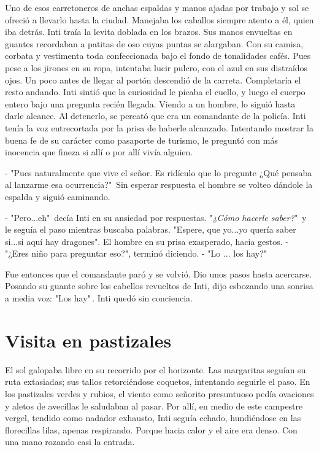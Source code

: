 Uno de esos carretoneros de anchas espaldas y manos ajadas por trabajo y sol se ofreció a llevarlo hasta la ciudad.  Manejaba los caballos siempre atento a él, quien iba detrás. Inti traía la levita doblada en los brazos. Sus manos envueltas en guantes recordaban a patitas de oso cuyas puntas se alargaban. Con su camisa, corbata y vestimenta toda confeccionada bajo el fondo de tonalidades cafés. Pues pese a los jirones en su ropa, intentaba lucir pulcro, con el azul en sus distraídos ojos. Un poco antes de llegar al portón descendió de la carreta. Completaría el resto andando. Inti sintió que la curiosidad le picaba el cuello, y luego el cuerpo entero bajo una pregunta recién llegada. Viendo a un hombre, lo siguió hasta darle alcance. Al detenerlo, se percató que era un comandante de la policía. Inti tenía la voz entrecortada por la prisa de haberle alcanzado. Intentando mostrar la buena fe de su carácter como pasaporte de turismo, le preguntó con más inocencia que fineza si allí o por allí vivía alguien.

- "Pues naturalmente que vive el señor. Es ridículo que lo pregunte ¿Qué pensaba al lanzarme esa ocurrencia?"\, Sin esperar respuesta el hombre se volteo dándole la espalda y siguió caminando.

- "Pero...eh"\, decía Inti en su ansiedad por respuestas. "\emph{¿Cómo hacerle saber?}"\, y le seguía el paso mientras buscaba palabras. "Espere, que yo...yo quería saber si...si aquí hay dragones". El hombre en su prisa exasperado, hacia gestos.
- "¿Eres niño para preguntar eso?", terminó diciendo.
- "Lo ... los hay?"

Fue entonces que el comandante paró y se volvió. Dio unos pasos hasta acercarse. Posando su guante sobre los cabellos revueltos de Inti, dijo esbozando una sonrisa a media voz: "Los hay"\,. Inti quedó sin conciencia.



\chapter{Visita en pastizales}
El sol galopaba libre en su recorrido por el horizonte. Las margaritas seguían su ruta extasiadas; sus tallos retorciéndose coquetos, intentando seguirle el paso. En los pastizales verdes y rubios, el viento como señorito presuntuoso pedía ovaciones y aletos de avecillas le saludaban al pasar. Por allí, en medio de este campestre vergel, tendido como nadador exhausto, Inti seguía echado, hundiéndose en las florecillas lilas, apenas respirando. Porque hacia calor y el aire era denso. Con una mano rozando casi la entrada.

